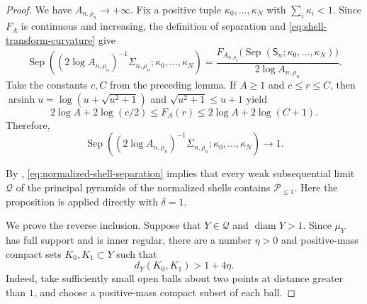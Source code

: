 \documentclass{amsart}
\numberwithin{equation}{section}
\theoremstyle{plain}
\theoremstyle{definition}
\theoremstyle{remark}
\newcommand{\Ple}{\mathcal{P}_{\le 1}}
\DeclareMathOperator{\diam}{diam}
\DeclareMathOperator{\Sep}{Sep}
\DeclareMathOperator{\arsinh}{arsinh}
\begin{document}
\begin{proof}
	We have $A_{n,\rho_n}\to+\infty$.  Fix a positive tuple
	$\kappa_0,\ldots,\kappa_N$ with $\sum_i\kappa_i<1$.  Since $F_A$ is
	continuous and increasing, the definition of separation and
	\eqref{eq:shell-transform-curvature} give
	\[
		\Sep\left(
		(2\log A_{n,\rho_n})^{-1}\Sigma_{n,\rho_n};
		\kappa_0,\ldots,\kappa_N\right)
		=
		\frac{F_{A_{n,\rho_n}}\bigl(\Sep(\mathsf S_n;\kappa_0,\ldots,\kappa_N)\bigr)}
		{2\log A_{n,\rho_n}}.
	\]
	Take the constants $c,C$ from the preceding lemma.  If $A\ge1$ and
	$c\le r\le C$, then
	$\arsinh u=\log(u+\sqrt{u^2+1})$ and
	$\sqrt{u^2+1}\le u+1$ yield
	\[
		2\log A+2\log(c/2)\le F_A(r)\le2\log A+2\log(C+1).
	\]
	Therefore,
	\begin{equation}\label{eq:normalized-shell-separation}
		\Sep\left(
		(2\log A_{n,\rho_n})^{-1}\Sigma_{n,\rho_n};
		\kappa_0,\ldots,\kappa_N\right)\longrightarrow1.
	\end{equation}

	By \cite[Proposition~8.5(1)]{shioya2016mmg},
	\eqref{eq:normalized-shell-separation} implies that every weak
	subsequential limit $\mathcal Q$ of the principal pyramids of the
	normalized shells contains $\Ple$.  Here the proposition is applied
	directly with $\delta=1$.

	We prove the reverse inclusion.  Suppose that $Y\in\mathcal Q$ and
	$\diam Y>1$.  Since $\mu_Y$ has full support and is inner regular, there
	are a number $\eta>0$ and positive-mass compact sets
	$K_0,K_1\subset Y$ such that
	\[
		d_Y(K_0,K_1)>1+4\eta.
	\]
	Indeed, take sufficiently small open balls about two points at distance
	greater than $1$, and choose a positive-mass compact subset of each ball.


\end{proof}
\end{document}
